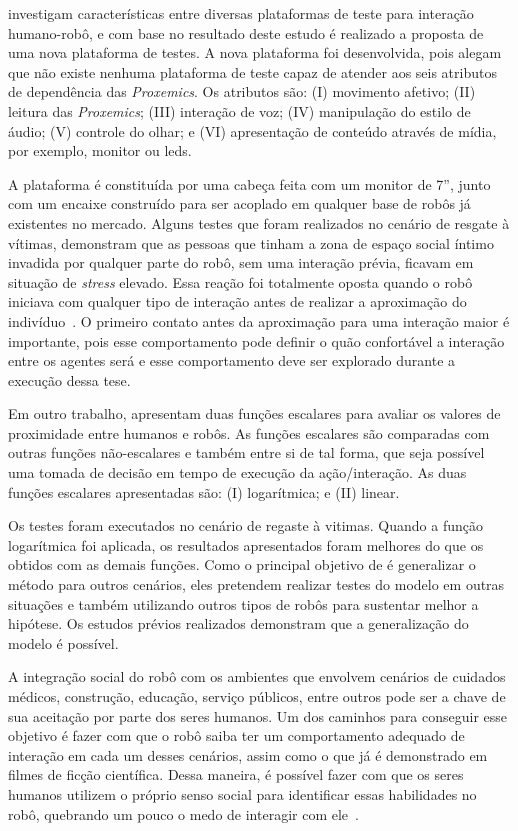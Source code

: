 \textcite{henkel:2012} investigam características entre diversas plataformas de teste para interação humano-robô, e com base no resultado deste estudo é realizado a proposta de uma nova plataforma de testes. A nova plataforma foi desenvolvida, pois \textcite{henkel:2012} alegam que não existe nenhuma plataforma de teste capaz de atender aos seis atributos de dependência das \emph{Proxemics}. Os atributos são: (I) movimento afetivo; (II) leitura das \emph{Proxemics}; (III) interação de voz; (IV) manipulação do estilo de áudio; (V) controle do olhar; e (VI) apresentação de conteúdo através de mídia, por exemplo, monitor ou leds.

A plataforma é constituída por uma cabeça feita com um monitor de 7'', junto com um encaixe construído para ser acoplado em qualquer base de robôs já existentes no mercado. Alguns testes que foram realizados no cenário de resgate à vítimas, demonstram que as pessoas que tinham a zona de espaço social íntimo invadida por qualquer parte do robô, sem uma interação prévia, ficavam em situação de \emph{stress} elevado. Essa reação foi totalmente oposta quando o robô iniciava com qualquer tipo de interação antes de realizar a aproximação do indivíduo~\cite{henkel:2012}. O primeiro contato antes da aproximação para uma interação maior é importante, pois esse comportamento pode definir o quão confortável a interação entre os agentes será e esse comportamento deve ser explorado durante a execução dessa tese.

Em outro trabalho, \textcite{henkel:2014} apresentam duas funções escalares para avaliar os valores de proximidade entre humanos e robôs. As funções escalares são comparadas com outras funções não-escalares e também entre si de tal forma, que seja possível uma tomada de decisão em tempo de execução da ação/interação. As duas funções escalares apresentadas são: (I) logarítmica; e (II) linear.

Os testes foram executados no cenário de regaste à vitimas. Quando a função logarítmica foi aplicada, os resultados apresentados foram melhores do que os obtidos com as demais funções. Como o principal objetivo de \textcite{henkel:2014} é generalizar o método para outros cenários, eles pretendem realizar testes do modelo em outras situações e também utilizando outros tipos de robôs para sustentar melhor a hipótese. Os estudos prévios realizados demonstram que a generalização do modelo é possível.

A integração social do robô com os ambientes que envolvem cenários de cuidados médicos, construção, educação, serviço públicos, entre outros pode ser a chave de sua aceitação por parte dos seres humanos. Um dos caminhos para conseguir esse objetivo é fazer com que o robô saiba ter um comportamento adequado de interação em cada um desses cenários, assim como o que já é demonstrado em filmes de ficção científica. Dessa maneira, é possível fazer com que os seres humanos utilizem o próprio senso social para identificar essas habilidades no robô, quebrando um pouco o medo de interagir com ele~\cite{heenan:2014}.

